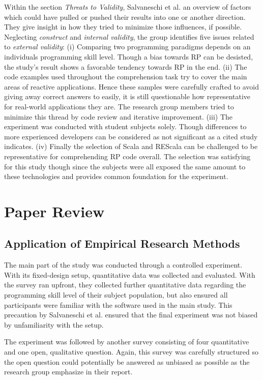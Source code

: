 \documentclass[12pt,a4paper]{article}
\begin{document}
Within the section \emph{Threats to Validity}, Salvaneschi et al. an overview of factors which could have pulled or pushed their results into one or another direction. They give insight in how they tried to minimize those influences, if possible. Neglecting \emph{construct} and \emph{internal validity}, the group identifies five issues related to \emph{external validity}: (i) Comparing two programming paradigms depends on an individuals programming skill level. Though a bias towards RP can be desisted, the study's result shows a favorable tendency towards RP in the end. (ii) The code examples used throughout the comprehension task try to cover the main areas of reactive applications. Hence these samples were carefully crafted to avoid giving away correct answers to easily, it is still questionable how representative for real-world applications they are. The research group members tried to minimize this thread by code review and iterative improvement. (iii) The experiment was conducted with student subjects solely. Though differences to more experienced developers can be considered as not significant as a cited study \cite{DiPenta} indicates. (iv) Finally the selection of Scala and REScala can be challenged to be representative for comprehending RP code overall. The selection was satisfying for this study though since the subjects were all exposed the same amount to these technologies and provides common foundation for the experiment.


\section{Paper Review}

\subsection{Application of Empirical Research Methods}

The main part of the study was conducted through a controlled experiment. With its fixed-design setup, quantitative data was collected and evaluated. With the survey ran upfront, they collected further quantitative data regarding the programming skill level of their subject population, but also ensured all participants were familiar with the software used in the main study. This precaution by Salvaneschi et al. ensured that the final experiment was not biased by unfamiliarity with the setup.

The experiment was followed by another survey consisting of four quantitative and one open, qualitative question. Again, this survey was carefully structured so the open question could potentially be answered as unbiased as possible as the research group emphasize in their report.
\end{document}
